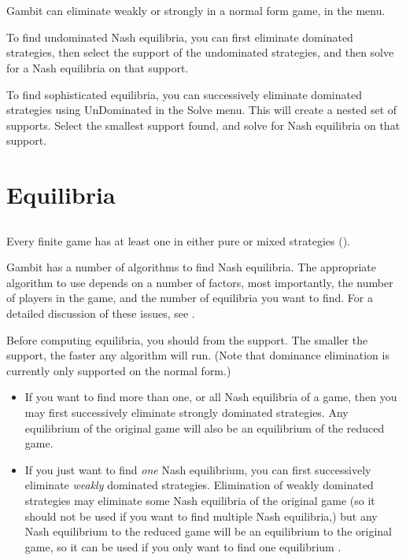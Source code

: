 {\section{}\label{domsec}

Gambit can eliminate weakly or strongly 
 in a 
normal form game, in the  menu.  

To find undominated Nash equilibria, you can first eliminate dominated 
strategies, then select the support of the undominated strategies, and then 
solve for a Nash equilibria on that support.  

To find sophisticated equilibria, you can successively eliminate 
dominated strategies using UnDominated in the Solve menu.  This will 
create a nested set of supports.  
Select the smallest support found, and solve for Nash equilibria on that 
support.  

\section{Equilibria}

\subsection{}\label{nashsec}
Every finite game has at least one  in either pure or mixed strategies (\cite{Nash:1950}).  

Gambit has a number of algorithms to find Nash equilibria.  
The appropriate algorithm to use 
depends on a number of factors, most importantly, the number of players in the 
game, and the number of equilibria you want to find.  For a detailed 
discussion of these issues, see \cite{McKMcL:1996}.  

Before computing equilibria, you should 
 from 
the support.  The smaller the support, the faster any algorithm will run.  (Note that 
dominance elimination is currently only supported on the normal form.) 
\begin{itemize}
\item 
If you want to find more than one, or all Nash equilibria of a game, then you may first 
successively eliminate strongly dominated strategies.  Any equilibrium of the original 
game will also be an equilibrium of the reduced game. 
\item 
If you just want to find {\em one} Nash equilibrium, you can first successively eliminate 
{\em weakly} dominated strategies.  Elimination of weakly dominated strategies may 
eliminate some Nash equilibria of the original game (so it should not be used if you 
want to find multiple Nash equilibria,) but any Nash equilibrium to the reduced 
game will be an equilibrium to the original game, so it can be used if you only 
want to find one equilibrium .  
\end{itemize}

}
